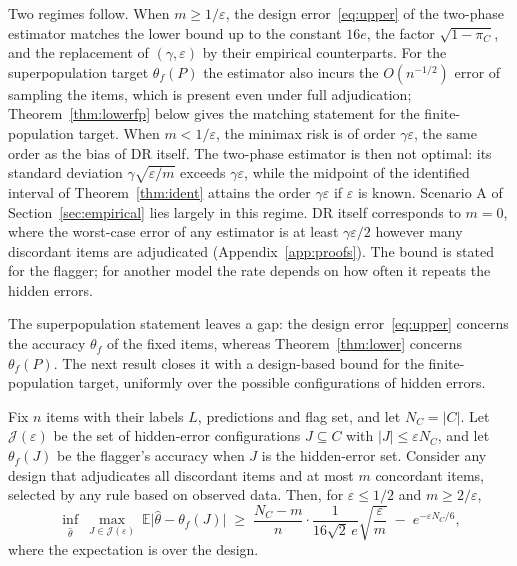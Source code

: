 \documentclass[twoside,11pt]{article}
\newcommand{\E}{\mathbb{E}}
\newcommand{\1}{\mathbf{1}}
\newcommand{\Cset}{C}
\begin{document}
Two regimes follow. When $m\ge1/\varepsilon$, the design error~\eqref{eq:upper} of the two-phase estimator matches the lower bound up to the constant $16e$, the factor $\sqrt{1-\pi_\Cset}$, and the replacement of $(\gamma,\varepsilon)$ by their empirical counterparts. For the superpopulation target $\theta_f(P)$ the estimator also incurs the $O(n^{-1/2})$ error of sampling the items, which is present even under full adjudication; Theorem~\ref{thm:lowerfp} below gives the matching statement for the finite-population target. When $m<1/\varepsilon$, the minimax risk is of order $\gamma\varepsilon$, the same order as the bias of DR itself. The two-phase estimator is then not optimal: its standard deviation $\gamma\sqrt{\varepsilon/m}$ exceeds $\gamma\varepsilon$, while the midpoint of the identified interval of Theorem~\ref{thm:ident} attains the order $\gamma\varepsilon$ if $\varepsilon$ is known. Scenario A of Section~\ref{sec:empirical} lies largely in this regime. DR itself corresponds to $m=0$, where the worst-case error of any estimator is at least $\gamma\varepsilon/2$ however many discordant items are adjudicated (Appendix~\ref{app:proofs}). The bound is stated for the flagger; for another model the rate depends on how often it repeats the hidden errors.

The superpopulation statement leaves a gap: the design error~\eqref{eq:upper} concerns the accuracy $\theta_f$ of the fixed items, whereas Theorem~\ref{thm:lower} concerns $\theta_f(P)$. The next result closes it with a design-based bound for the finite-population target, uniformly over the possible configurations of hidden errors.

\begin{theorem}\label{thm:lowerfp}
Fix $n$ items with their labels $L$, predictions and flag set, and let $N_\Cset=|\Cset|$. Let $\mathcal J(\varepsilon)$ be the set of hidden-error configurations $J\subseteq\Cset$ with $|J|\le\varepsilon N_\Cset$, and let $\theta_f(J)$ be the flagger's accuracy when $J$ is the hidden-error set. Consider any design that adjudicates all discordant items and at most $m$ concordant items, selected by any rule based on observed data. Then, for $\varepsilon\le1/2$ and $m\ge2/\varepsilon$,
\[
\inf_{\hat\theta}\ \max_{J\in\mathcal J(\varepsilon)}\ \E\big|\hat\theta-\theta_f(J)\big|\;\ge\;\frac{N_\Cset-m}{n}\cdot\frac{1}{16\sqrt2\,e}\sqrt{\frac{\varepsilon}{m}}\;-\;e^{-\varepsilon N_\Cset/6},
\]
where the expectation is over the design.
\end{theorem}
\end{document}

